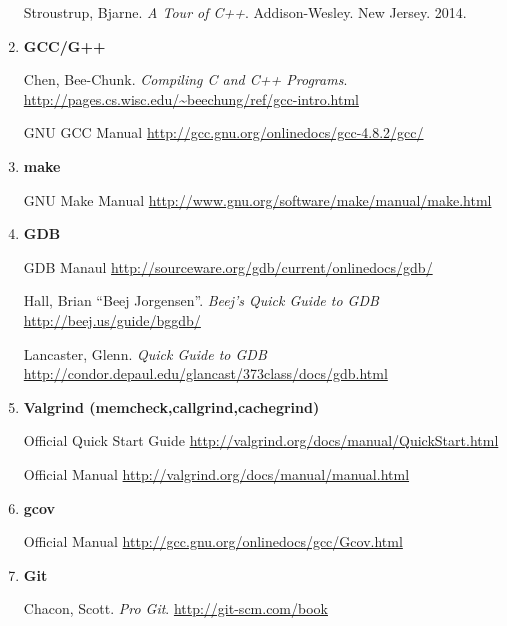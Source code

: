 \documentclass[10pt]{article}
\begin{document}
\begin{enumerate}
Stroustrup, Bjarne. \textit{A Tour of C++}. Addison-Wesley. New Jersey. 2014.  

\item \textbf{GCC/G++}

Chen, Bee-Chunk. \textit{Compiling C and C++ Programs}.
\newline \url{http://pages.cs.wisc.edu/~beechung/ref/gcc-intro.html}
\vspace{.25in}

GNU GCC Manual \newline
\url{http://gcc.gnu.org/onlinedocs/gcc-4.8.2/gcc/}

\item \textbf{make}

GNU Make Manual \newline
\url{http://www.gnu.org/software/make/manual/make.html}

\item \textbf{GDB}

GDB Manaul \newline
\url{http://sourceware.org/gdb/current/onlinedocs/gdb/}
\vspace{.25in}

Hall, Brian ``Beej Jorgensen''. \textit{Beej's Quick Guide to GDB} \newline
\url{http://beej.us/guide/bggdb/}
\vspace{.25in}

Lancaster, Glenn. \textit{Quick Guide to GDB} \newline
\url{http://condor.depaul.edu/glancast/373class/docs/gdb.html}
\vspace{.25in}

\item \textbf{Valgrind (memcheck,callgrind,cachegrind)}

Official Quick Start Guide \newline
\url{http://valgrind.org/docs/manual/QuickStart.html}
\vspace{.25in}

Official Manual \newline
\url{http://valgrind.org/docs/manual/manual.html}

\item \textbf{gcov}

Official Manual \newline
\url{http://gcc.gnu.org/onlinedocs/gcc/Gcov.html}

\item \textbf{Git}

Chacon, Scott. \textit{Pro Git}. \url{http://git-scm.com/book}


\end{enumerate}
\end{document}

